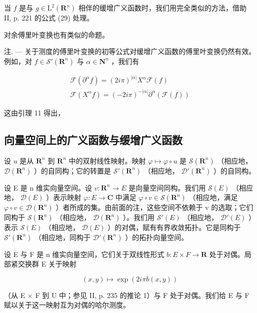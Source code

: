 当 \(f\) 是与 \(g \in \mathrm{L}^2(\mathbf{R}^n)\) 相伴的缓增广义函数时，我们用完全类似的方法，借助 II, p. 221 的公式 (29) 处理。

对余傅里叶变换也有类似的命题。

注. --- 关于测度的傅里叶变换的初等公式对缓增广义函数的傅里叶变换仍然有效。例如，对 \(f \in \mathcal{S}'(\mathbf{R}^{n})\) 与 \(\alpha \in \mathbf{N}^{n}\) ，我们有

\[
\begin{array}{l} \mathcal {F} (\partial^ {\alpha} f) = (2 i \pi) ^ {| \alpha |} X ^ {\alpha} \mathcal {F} (f) \\ \mathcal {F} (X ^ {\alpha} f) = (- 2 i \pi) ^ {- | \alpha |} \partial^ {\alpha} (\mathcal {F} (f)) \end{array}
\]

这由引理 11 得出，

\subsection{向量空间上的广义函数与缓增广义函数}

设 \(u\) 是从 \(\mathbf{R}^{n}\) 到 \(\mathbf{R}^{n}\) 中的双射线性映射。映射 \(\varphi \mapsto \varphi \circ u\) 是 \(\mathcal{S}(\mathbf{R}^{n})\) （相应地， \(\mathcal{D}(\mathbf{R}^{n})\) ）的自同构；它的转置是 \(\mathcal{S}'(\mathbf{R}^{n})\) （相应地， \(\mathcal{D}'(\mathbf{R}^{n})\) ）的自同构。

设 E 是 n 维实向量空间。设 \(v: \mathbf{R}^{n} \to E\) 是向量空间同构。我们用 \(\mathcal{S}(E)\) （相应地， \(\mathcal{D}(E)\) ）表示映射 \(\varphi: E \to \mathbf{C}\) 中满足 \(\varphi \circ v \in \mathcal{S}(\mathbf{R}^{n})\) （相应地，满足 \(\varphi \circ v \in \mathcal{D}(\mathbf{R}^{n})\) ）者所成的集。由前面的注，这些空间不依赖于 v 的选取；它们同构于 \(\mathcal{S}(\mathbf{R}^{n})\) （相应地， \(\mathcal{D}(\mathbf{R}^{n})\) ）。我们用 \(\mathcal{S}'(E)\) （相应地， \(\mathcal{D}'(E)\) ）表示 \(\mathcal{S}(E)\) （相应地， \(\mathcal{D}(E)\) ）的对偶，赋有有界收敛拓扑。它是同构于 \(\mathcal{S}'(\mathbf{R}^{n})\) （相应地，同构于 \(\mathcal{D}'(\mathbf{R}^{n})\) ）的拓扑向量空间。

设 E 与 F 是 n 维实向量空间，它们关于双线性形式 \(b: E \times F \to \mathbf{R}\) 处于对偶。局部紧交换群 E 关于映射 

\[
(x, y) \mapsto \exp (2 i \pi b (x, y))
\]

（从 E × F 到 U 中；参见 II, p. 235 的推论 1）与 F 处于对偶。我们给 E 与 F 赋以关于这一映射互为对偶的哈尔测度。

